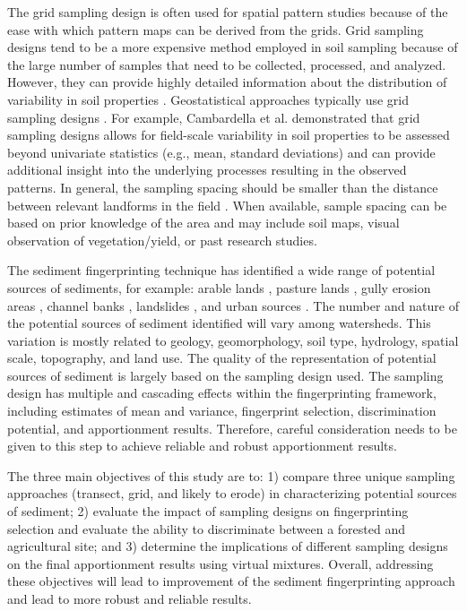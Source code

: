 \documentclass[
  number]{elsarticle}
\begin{document}
The grid sampling design is often used for spatial pattern studies
because of the ease with which pattern maps can be derived from the
grids. Grid sampling designs tend to be a more expensive method employed
in soil sampling because of the large number of samples that need to be
collected, processed, and analyzed. However, they can provide highly
detailed information about the distribution of variability in soil
properties \citep{pennock2008}. Geostatistical approaches typically use
grid sampling designs \citep{pennock2008}. For example, Cambardella et
al. \citep{cambardella1994} demonstrated that grid sampling designs
allows for field-scale variability in soil properties to be assessed
beyond univariate statistics (e.g., mean, standard deviations) and can
provide additional insight into the underlying processes resulting in
the observed patterns. In general, the sampling spacing should be
smaller than the distance between relevant landforms in the field
\citep{pennock2008}. When available, sample spacing can be based on
prior knowledge of the area and may include soil maps, visual
observation of vegetation/yield, or past research studies.

The sediment fingerprinting technique has identified a wide range of
potential sources of sediments, for example: arable lands
\citep[e.g.,][]{russell2001}, pasture lands \citep[e.g.,][]{blake2012},
gully erosion areas \citep[e.g.,][]{evrard2013}, channel banks
\citep[e.g.,][]{collins2010}, landslides \citep[e.g.,][]{nelson2002},
and urban sources \citep[e.g.,][]{carter2003}. The number and nature of
the potential sources of sediment identified will vary among watersheds.
This variation is mostly related to geology, geomorphology, soil type,
hydrology, spatial scale, topography, and land use. The quality of the
representation of potential sources of sediment is largely based on the
sampling design used. The sampling design has multiple and cascading
effects within the fingerprinting framework, including estimates of mean
and variance, fingerprint selection, discrimination potential, and
apportionment results. Therefore, careful consideration needs to be
given to this step to achieve reliable and robust apportionment results.

The three main objectives of this study are to: 1) compare three unique
sampling approaches (transect, grid, and likely to erode) in
characterizing potential sources of sediment; 2) evaluate the impact of
sampling designs on fingerprinting selection and evaluate the ability to
discriminate between a forested and agricultural site; and 3) determine
the implications of different sampling designs on the final
apportionment results using virtual mixtures. Overall, addressing these
objectives will lead to improvement of the sediment fingerprinting
approach and lead to more robust and reliable results.
\end{document}

